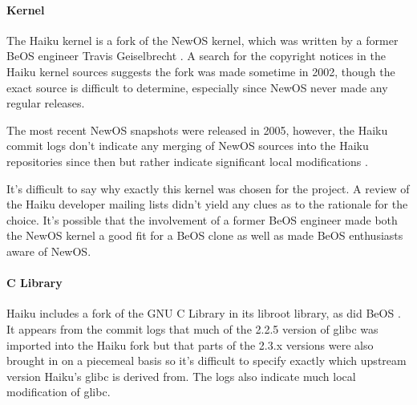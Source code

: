 \documentclass{article}
\begin{document}


\paragraph{Kernel}
The Haiku kernel is a fork of the NewOS kernel, which was written by a
former BeOS engineer Travis Geiselbrecht \cite{HaikuWiki}.  A search
for the copyright notices in the Haiku kernel sources suggests the
fork was made sometime in 2002, though the exact source is difficult
to determine, especially since NewOS never made any regular releases.

The most recent NewOS snapshots were released in 2005, however, the
Haiku commit logs don't indicate any merging of NewOS sources into the
Haiku repositories since then but rather indicate significant local
modifications \cite{HaikuKernelCommitLogs}.

It's difficult to say why exactly this kernel was chosen for the
project.  A review of the Haiku developer mailing lists didn't yield
any clues as to the rationale for the choice.  It's possible that the
involvement of a former BeOS engineer made both the NewOS kernel a
good fit for a BeOS clone as well as made BeOS enthusiasts aware of
NewOS.

\paragraph{C Library}
Haiku includes a fork of the GNU C Library in its libroot library, as
did BeOS \cite{GlibCWiki}.  It appears from the commit logs that much
of the 2.2.5 version of glibc was imported into the Haiku
fork \cite{HaikuLibrootGlibcOld} but that parts of the 2.3.x versions
were also brought in on a piecemeal
basis \cite{HaikuLibrootGlibcRecent} so it's difficult to specify
exactly which upstream version Haiku's glibc is derived from.  The
logs also indicate much local modification of glibc.
\end{document}
